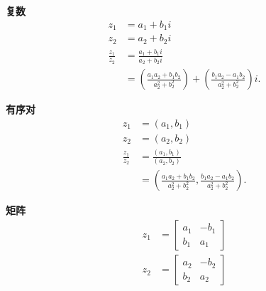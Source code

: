 \begin{tcolorbox}[breakable, enhanced, title = {商}]
  \textbf{复数}
  $$
    \begin{aligned}
      z_{1}               & =a_{1}+b_{1} i                                                                                                                         \\
      z_{2}               & =a_{2}+b_{2} i                                                                                                                         \\
      \frac{z_{1}}{z_{2}} & =\frac{a_{1}+b_{1} i}{a_{2}+b_{2} i}                                                                                                   \\
                          & =\left(\frac{a_{1} a_{2}+b_{1} b_{2}}{a_{2}^{2}+b_{2}^{2}}\right)+\left(\frac{b_{1} a_{2}-a_{1} b_{2}}{a_{2}^{2}+b_{2}^{2}}\right) i .
    \end{aligned}
  $$

  \textbf{有序对}
  $$
    \begin{aligned}
      z_{1}               & =\left(a_{1}, b_{1}\right)                                                                                               \\
      z_{2}               & =\left(a_{2}, b_{2}\right)                                                                                               \\
      \frac{z_{1}}{z_{2}} & =\frac{\left(a_{1}, b_{1}\right)}{\left(a_{2}, b_{2}\right)}                                                             \\
                          & =\left(\frac{a_{1} a_{2}+b_{1} b_{2}}{a_{2}^{2}+b_{2}^{2}}, \frac{b_{1} a_{2}-a_{1} b_{2}}{a_{2}^{2}+b_{2}^{2}}\right) .
    \end{aligned}
  $$

  \textbf{矩阵}
  $$
    \begin{aligned}
      z_{1} & =\left[\begin{array}{cc}
          a_{1} & -b_{1} \\
          b_{1} & a_{1}
        \end{array}\right] \\
      z_{2} & =\left[\begin{array}{cc}
          a_{2} & -b_{2} \\
          b_{2} & a_{2}
        \end{array}\right]\end{aligned}
  $$


\end{tcolorbox}
